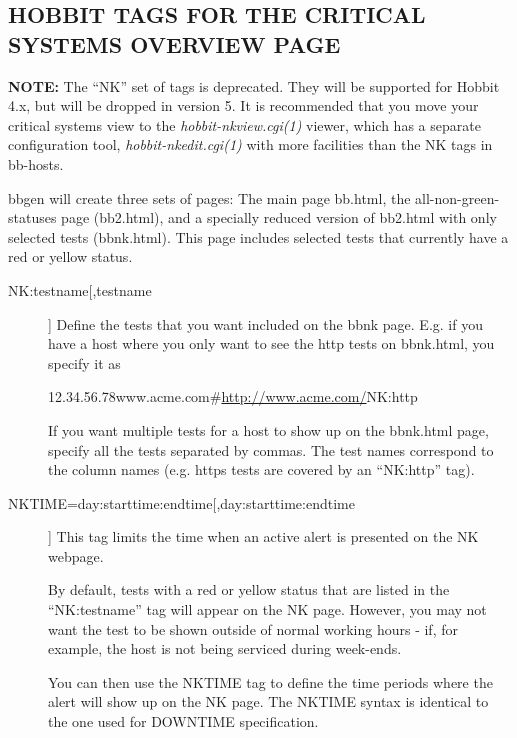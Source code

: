 \subsection{HOBBIT TAGS FOR THE CRITICAL SYSTEMS OVERVIEW PAGE}
\textbf{NOTE:}
 The ``NK'' set of tags is deprecated. They will be supported for
 Hobbit 4.x, but will be dropped in version 5. It is recommended that
 you move your critical systems view to the
 \emph{hobbit-nkview.cgi(1)} viewer, which has a separate
 configuration tool, \emph{hobbit-nkedit.cgi(1)} with more facilities
 than the NK tags in bb-hosts. 


 bbgen will create three sets of pages: The main page bb.html, the
 all-non-green-statuses page (bb2.html), and a specially reduced
 version of bb2.html with only selected tests (bbnk.html). This page
 includes selected tests that currently have a red or yellow status. 



 \begin{description}
\item[NK:testname[,testname]] Define the tests that you want included
  on the bbnk page. E.g. if you have a host where you only want to see
  the http tests on bbnk.html, you specify it as 


  
12.34.56.78www.acme.com\#\url{http://www.acme.com/}NK:http 


  If you want multiple tests for a host to show up on the bbnk.html
  page, specify all the tests separated by commas. The test names
  correspond to the column names (e.g. https tests are covered by an
  ``NK:http'' tag). 



\item[NKTIME=day:starttime:endtime[,day:starttime:endtime]] This tag limits the time when an active alert is presented on the NK webpage. 

  By default, tests with a red or yellow status that are listed in the
  ``NK:testname'' tag will appear on the NK page. However, you may not
  want the test to be shown outside of normal working hours - if, for
  example, the host is not being serviced during week-ends. 



  You can then use the NKTIME tag to define the time periods where the
  alert will show up on the NK page. The NKTIME syntax is identical to
  the one used for DOWNTIME specification. 


\end{description}

